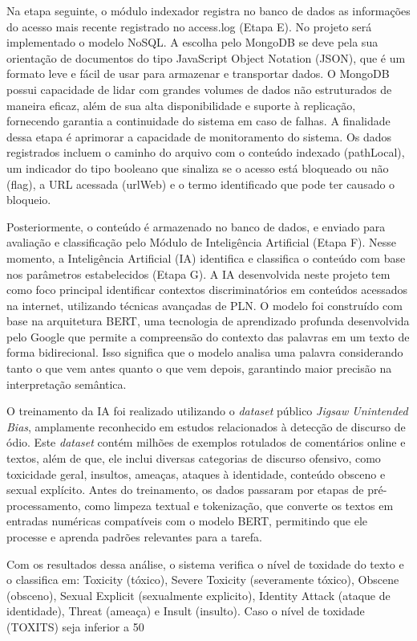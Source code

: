 Na etapa seguinte, o módulo indexador registra no banco de dados as informações do acesso mais recente registrado no access.log (Etapa E). No projeto será implementado o modelo NoSQL. A escolha pelo MongoDB se deve pela sua orientação de documentos do tipo JavaScript Object Notation (JSON), que é um formato leve e fácil de usar para armazenar e transportar dados. O MongoDB possui capacidade de lidar com grandes volumes de dados não estruturados de maneira eficaz, além de sua alta disponibilidade e suporte à replicação, fornecendo garantia a continuidade do sistema em caso de falhas. 
A finalidade dessa etapa é aprimorar a capacidade de monitoramento do sistema. Os dados registrados incluem o caminho do arquivo com o conteúdo indexado (pathLocal), um indicador do tipo booleano que sinaliza se o acesso está bloqueado ou não (flag), a URL acessada (urlWeb) e o termo identificado que pode ter causado o bloqueio.

Posteriormente, o conteúdo é armazenado no banco de dados, e enviado para avaliação e classificação pelo Módulo de Inteligência Artificial (Etapa F). Nesse momento, a Inteligência Artificial (IA) identifica e classifica o conteúdo com base nos parâmetros estabelecidos (Etapa G). A IA desenvolvida neste projeto tem como foco principal identificar contextos discriminatórios em conteúdos acessados na internet, utilizando técnicas avançadas de PLN. O modelo foi construído com base na arquitetura BERT, uma tecnologia de aprendizado profunda desenvolvida pelo Google que permite a compreensão do contexto das palavras em um texto de forma bidirecional. Isso significa que o modelo analisa uma palavra considerando tanto o que vem antes quanto o que vem depois, garantindo maior precisão na interpretação semântica.

O treinamento da IA foi realizado utilizando o \textit{dataset} público \textit {Jigsaw Unintended Bias}, amplamente reconhecido em estudos relacionados à detecção de discurso de ódio. Este \textit{dataset} contém milhões de exemplos rotulados de comentários online e textos, além de que, ele inclui diversas categorias de discurso ofensivo, como toxicidade geral, insultos, ameaças, ataques à identidade, conteúdo obsceno e sexual explícito. Antes do treinamento, os dados passaram por etapas de pré-processamento, como limpeza textual e tokenização, que converte os textos em entradas numéricas compatíveis com o modelo BERT, permitindo que ele processe e aprenda padrões relevantes para a tarefa.

Com os resultados dessa análise, o sistema verifica o nível de toxidade do texto e o classifica em: Toxicity (tóxico), Severe Toxicity (severamente tóxico), Obscene (obsceno), Sexual Explicit (sexualmente explicito), Identity Attack (ataque de identidade), Threat (ameaça) e Insult (insulto). Caso o nível de toxidade (TOXITS) seja inferior a 50%

